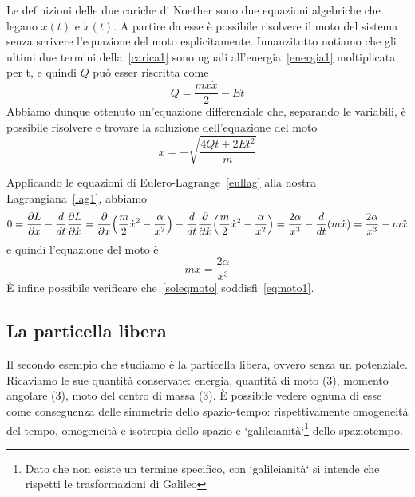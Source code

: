 \begin{example}
        \hfill

        Le definizioni delle due cariche di Noether sono due equazioni algebriche che legano $x(t)$ e $\dot x(t)$. A partire da esse è possibile risolvere il moto del sistema senza scrivere l'equazione del moto esplicitamente. Innanzitutto notiamo che gli ultimi due termini della~\eqref{carica1} sono uguali all'energia~\eqref{energia1} moltiplicata per t, e quindi $Q$ può esser riscritta come
    \begin{equation*}
        Q = \frac{m x \dot x}{2} - Et
    \end{equation*}
        Abbiamo dunque ottenuto un'equazione differenziale che, separando le variabili, è possibile risolvere e trovare la soluzione dell'equazione del moto
    \begin{equation} \label{soleqmoto}
        x = \pm \sqrt{\frac{4Qt + 2Et^2}{m}}
    \end{equation}
        
        Applicando le equazioni di Eulero-Lagrange~\eqref{eullag} alla nostra Lagrangiana~\eqref{lag1}, abbiamo
    \begin{equation*}
        0 = \frac{\partial L}{\partial x}  - \frac{d}{dt} \frac{\partial L}{\partial\dot x} = \frac{\partial}{\partial x} \Big(\frac{m}{2} \dot x^2 - \frac{\alpha}{x^2} \Big) - \frac{d}{dt} \frac{\partial}{\partial\dot x} \Big(\frac{m}{2} \dot x^2 - \frac{\alpha}{x^2} \Big) = \frac{2 \alpha}{x^3} - \frac{d}{dt} (m \dot x) = \frac{2 \alpha}{x^3} - m \ddot x 
    \end{equation*}
        e quindi l'equazione del moto è
    \begin{equation}\label{eqmoto1}
        m \ddot x = \frac{2 \alpha}{x^3}
    \end{equation}
        È infine possibile verificare che~\eqref{soleqmoto} soddisfi~\eqref{eqmoto1}.
    \end{example}

\subsection{La particella libera}
    Il secondo esempio che studiamo è la particella libera, ovvero senza un potenziale. Ricaviamo le sue quantità conservate: energia, quantità di moto (3), momento angolare (3), moto del centro di massa (3). È possibile vedere ognuna di esse come conseguenza delle simmetrie dello spazio-tempo: rispettivamente omogeneità del tempo, omogeneità e isotropia dello spazio e `galileianità`\footnote{Dato che non esiste un termine specifico, con `galileianità` si intende che rispetti le trasformazioni di Galileo} dello spaziotempo.

